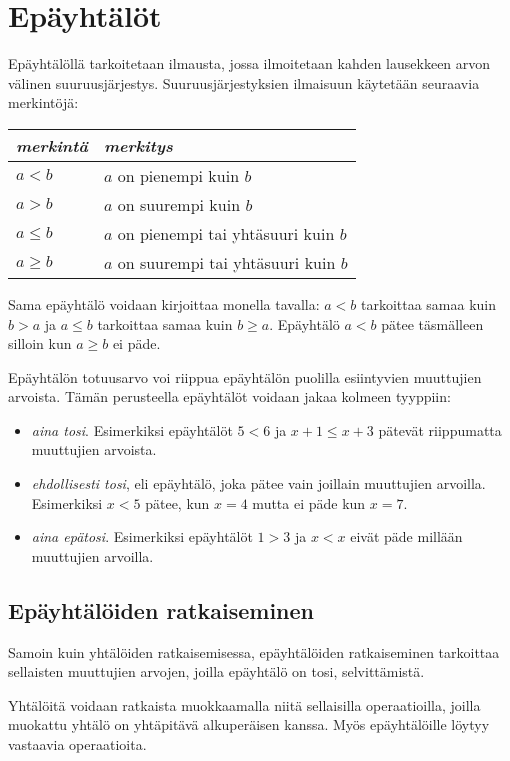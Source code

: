 \chapter{Epäyhtälöt}
Epäyhtälöllä tarkoitetaan ilmausta, jossa ilmoitetaan kahden lausekkeen arvon välinen suuruusjärjestys. Suuruusjärjestyksien ilmaisuun käytetään seuraavia merkintöjä:

\begin{center}
\begin{tabular}{l|l}
\emph{merkintä} & \emph{merkitys} \\
\hline
$a<b$ &  $a$ on pienempi kuin $b$ \\
$a>b$ & $a$ on suurempi kuin $b$ \\
$a \leq b$ & $a$ on pienempi tai yhtäsuuri kuin $b$ \\
$a \geq b$ & $a$ on suurempi tai yhtäsuuri kuin $b$ \\
\end{tabular}
\end{center}

Sama epäyhtälö voidaan kirjoittaa monella tavalla: $a < b$ tarkoittaa samaa kuin $b > a$ ja $a \leq b$ tarkoittaa samaa kuin $b \geq a$. Epäyhtälö $a < b$ pätee täsmälleen silloin kun $a \geq b$ ei päde.

Epäyhtälön totuusarvo voi riippua epäyhtälön puolilla esiintyvien muuttujien arvoista. Tämän perusteella epäyhtälöt voidaan jakaa kolmeen tyyppiin:
\begin{itemize}
\item \emph{aina tosi}. Esimerkiksi epäyhtälöt $5 < 6$ ja $x + 1 \leq x + 3$ pätevät riippumatta muuttujien arvoista.
\item \emph{ehdollisesti tosi}, eli epäyhtälö, joka pätee vain joillain muuttujien arvoilla. Esimerkiksi $x < 5$ pätee, kun $x = 4$ mutta ei päde kun $x = 7$.
\item \emph{aina epätosi}. Esimerkiksi epäyhtälöt $1 > 3$ ja $x < x$ eivät päde millään muuttujien arvoilla.
\end{itemize}

\section{Epäyhtälöiden ratkaiseminen}
Samoin kuin yhtälöiden ratkaisemisessa, epäyhtälöiden ratkaiseminen tarkoittaa sellaisten muuttujien arvojen, joilla epäyhtälö on tosi, selvittämistä.

Yhtälöitä voidaan ratkaista muokkaamalla niitä sellaisilla operaatioilla, joilla muokattu yhtälö on yhtäpitävä alkuperäisen kanssa. Myös epäyhtälöille löytyy vastaavia operaatioita.

